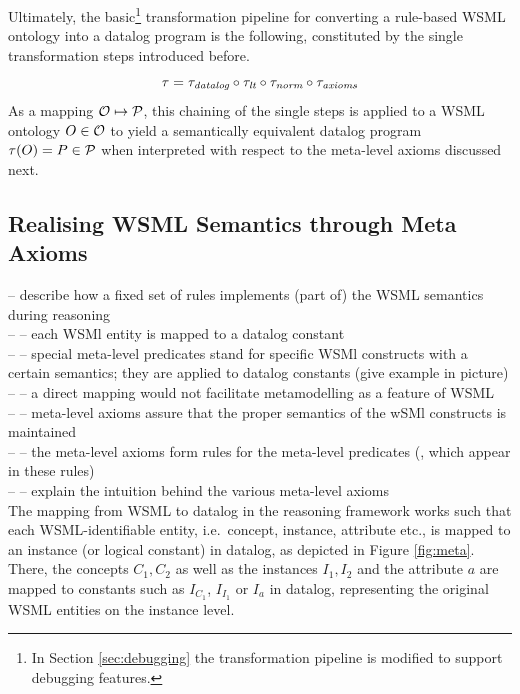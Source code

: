 \bigskip

Ultimately, the basic\footnote{In Section \ref{sec:debugging} the
transformation pipeline is modified to support debugging
features.} transformation pipeline for converting a rule-based
WSML ontology into a datalog program is the following, constituted
by the single transformation steps introduced before.
\begin{displaymath}
    \tau = \transdlog \circ \translt \circ \transnorm \circ \transax
\end{displaymath}
As a mapping $\O \mapsto \P$, this chaining of the single steps is
applied to a WSML ontology $O \in \O$ to yield a semantically
equivalent datalog program $\tau (O) = P \in \P$ when interpreted
with respect to the meta-level axioms discussed next.

\subsection{Realising WSML Semantics through Meta Axioms}
-- describe how a fixed set of rules implements (part of) the WSML semantics during reasoning \\
-- -- each WSMl entity is mapped to a datalog constant \\
-- -- special meta-level predicates stand for specific WSMl constructs with a certain semantics; they are applied to datalog constants (give example in picture) \\
-- -- a direct mapping would not facilitate metamodelling as a feature of WSML \\
-- -- meta-level axioms assure that the proper semantics of the wSMl constructs is maintained \\
-- -- the meta-level axioms form rules for the meta-level predicates (, which appear in these rules) \\
-- -- explain the intuition behind the various meta-level axioms \\

The mapping from WSML to datalog in the reasoning framework works
such that each WSML-identifiable entity, i.e.\ concept, instance,
attribute etc., is mapped to an instance (or logical constant) in
datalog, as depicted in Figure \ref{fig:meta}. There, the concepts
$C_1, C_2$ as well as the instances $I_1, I_2$ and the attribute
$a$ are mapped to constants such as $I_{C_1}$, $I_{I_1}$ or $I_a$
in datalog, representing the original WSML entities on the
instance level.

